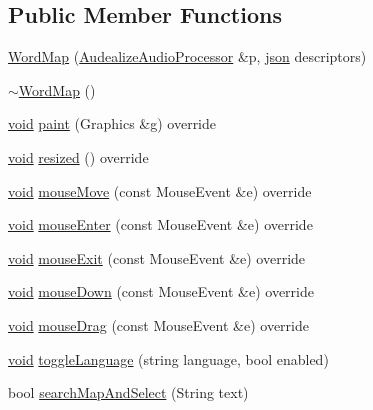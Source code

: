 \subsection*{Public Member Functions}
\begin{DoxyCompactItemize}
\item 
\hyperlink{class_audealize_1_1_word_map_a9171cf3dff58036a4a7e7dd0228237f2}{Word\+Map} (\hyperlink{class_audealize_1_1_audealize_audio_processor}{Audealize\+Audio\+Processor} \&p, \hyperlink{_audealize_u_i_8cpp_ab701e3ac61a85b337ec5c1abaad6742d}{json} descriptors)
\item 
\hyperlink{class_audealize_1_1_word_map_ac4a502a1ed5e93552ddd276329111146}{$\sim$\+Word\+Map} ()
\item 
\hyperlink{tk_8h_aba408b7cd755a96426e004c015f5de8e}{void} \hyperlink{class_audealize_1_1_word_map_a780acfabb4341154db019fc173f3265c}{paint} (Graphics \&g) override
\item 
\hyperlink{tk_8h_aba408b7cd755a96426e004c015f5de8e}{void} \hyperlink{class_audealize_1_1_word_map_afc6d89086738cd2b58d42f9ac8972f24}{resized} () override
\item 
\hyperlink{tk_8h_aba408b7cd755a96426e004c015f5de8e}{void} \hyperlink{class_audealize_1_1_word_map_ae9a52d3cfc6b9c1da80b384165e3d61e}{mouse\+Move} (const Mouse\+Event \&e) override
\item 
\hyperlink{tk_8h_aba408b7cd755a96426e004c015f5de8e}{void} \hyperlink{class_audealize_1_1_word_map_a7cc1f91aeed97a5b842a3f7646b7228b}{mouse\+Enter} (const Mouse\+Event \&e) override
\item 
\hyperlink{tk_8h_aba408b7cd755a96426e004c015f5de8e}{void} \hyperlink{class_audealize_1_1_word_map_a33d4e818315cef6037f0419be0178d7a}{mouse\+Exit} (const Mouse\+Event \&e) override
\item 
\hyperlink{tk_8h_aba408b7cd755a96426e004c015f5de8e}{void} \hyperlink{class_audealize_1_1_word_map_aa98ecc9f12940f480e220baea915c988}{mouse\+Down} (const Mouse\+Event \&e) override
\item 
\hyperlink{tk_8h_aba408b7cd755a96426e004c015f5de8e}{void} \hyperlink{class_audealize_1_1_word_map_a350ab0b3b97bde625f0f156dddcade58}{mouse\+Drag} (const Mouse\+Event \&e) override
\item 
\hyperlink{tk_8h_aba408b7cd755a96426e004c015f5de8e}{void} \hyperlink{class_audealize_1_1_word_map_aaffcf9380fd48667dc2bfc20c7ffd52f}{toggle\+Language} (string language, bool enabled)
\item 
bool \hyperlink{class_audealize_1_1_word_map_a28c414999ad1f1adad1172497fdefb1e}{search\+Map\+And\+Select} (String text)

\end{DoxyCompactItemize}
